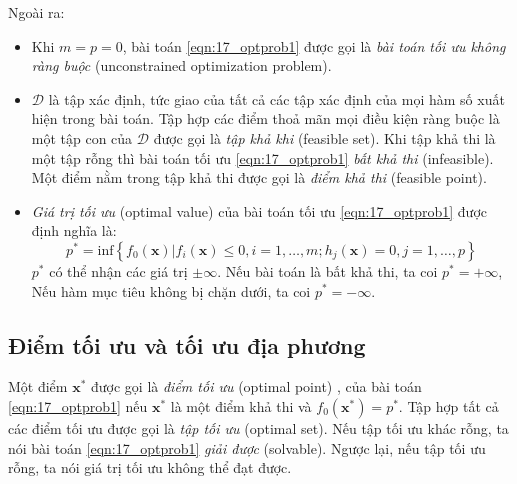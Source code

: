 Ngoài ra:
\begin{itemize}
    \item Khi $m = p = 0$, bài toán \eqref{eqn:17_optprob1} được gọi là
    \textit{bài toán tối ưu không ràng buộc} ({unconstrained optimization
    problem}). 
     
    \item $\mathcal{D}$ là tập xác định, tức giao của tất cả các tập xác định
    của mọi hàm số xuất hiện trong bài toán. Tập hợp các điểm thoả mãn mọi điều
    kiện ràng buộc là một tập con của $\mathcal{D}$ được gọi là \textit{tập khả khi} (feasible set). Khi tập khả thi là một tập rỗng thì bài toán tối ưu \eqref{eqn:17_optprob1} \textit{bất khả thi} ({infeasible}). Một điểm nằm trong tập khả thi được gọi là \textit{điểm khả thi} (feasible point).
     
    \item  \textit{Giá trị tối ưu} (optimal value) của bài toán tối ưu \eqref{eqn:17_optprob1} được định nghĩa là: 
    \begin{equation*} 
    p^* = \text{inf}\left\{f_0(\mathbf{x}) | f_i(\mathbf{x}) \leq 0, i = 1, \dots, m; h_j(\mathbf{x}) = 0, j = 1, \dots, p\right\} 
    \end{equation*} 
    $p^*$ có thể nhận các giá
    trị $\pm \infty$. Nếu bài toán là bất khả thi, ta coi $p^* = + \infty$, Nếu hàm mục tiêu
    không bị chặn dưới, ta coi
    $p^* = - \infty$.

\end{itemize}
 
 
\subsection{Điểm tối ưu và tối ưu địa phương}

Một điểm $\mathbf{x}^*$ được gọi là \textit{điểm tối ưu} ({optimal point})
, của bài toán
\eqref{eqn:17_optprob1} nếu $\mathbf{x}^*$ là một điểm khả thi và
$f_0(\mathbf{x}^*) = p^*$. Tập hợp tất cả các điểm tối ưu được gọi là
\textit{tập tối ưu} ({optimal set}). Nếu tập tối ưu khác rỗng,
ta nói bài toán \eqref{eqn:17_optprob1} \textit{giải được}
({solvable}). Ngược lại, nếu tập tối ưu rỗng, ta nói giá trị tối ưu không thể đạt được.
 
